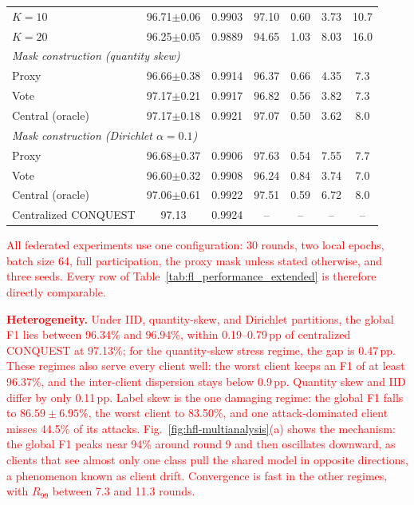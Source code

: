 \documentclass[conference]{IEEEtran}
\begin{document}
\begin{table}[!t]
\begin{tabular}{lcccccc}
$K{=}10$ & 96.71$\pm$0.06 & 0.9903 & 97.10 & 0.60 & 3.73 & 10.7 \\
$K{=}20$ & 96.25$\pm$0.05 & 0.9889 & 94.65 & 1.03 & 8.03 & 16.0 \\
\midrule
\multicolumn{7}{l}{\textit{Mask construction (quantity skew)}} \\
Proxy & 96.66$\pm$0.38 & 0.9914 & 96.37 & 0.66 & 4.35 & 7.3 \\
Vote & 97.17$\pm$0.21 & 0.9917 & 96.82 & 0.56 & 3.82 & 7.3 \\
Central (oracle) & 97.17$\pm$0.18 & 0.9921 & 97.07 & 0.50 & 3.62 & 8.0 \\
\midrule
\multicolumn{7}{l}{\textit{Mask construction (Dirichlet $\alpha{=}0.1$)}} \\
Proxy & 96.68$\pm$0.37 & 0.9906 & 97.63 & 0.54 & 7.55 & 7.7 \\
Vote & 96.60$\pm$0.32 & 0.9908 & 96.24 & 0.84 & 3.74 & 7.0 \\
Central (oracle) & 97.06$\pm$0.61 & 0.9922 & 97.51 & 0.59 & 6.72 & 8.0 \\
\midrule
Centralized CONQUEST & 97.13 & 0.9924 & -- & -- & -- & -- \\
\hline\toprule
\end{tabular}
\end{table}

\textcolor{red}{All federated experiments
use one configuration: 30 rounds, two local epochs, batch size 64,
full participation, the proxy mask unless stated otherwise, and three
seeds. Every row of Table~\ref{tab:fl_performance_extended} is
therefore directly comparable.}

\textcolor{red}{\textbf{Heterogeneity.} Under IID,
quantity-skew, and Dirichlet partitions, the global F1 lies between
96.34\% and 96.94\%, within 0.19--0.79\,pp of centralized CONQUEST at
97.13\%; for the quantity-skew stress regime, the gap is 0.47\,pp.
These regimes also serve every client well: the worst client keeps an
F1 of at least 96.37\%, and the inter-client dispersion stays below
0.9\,pp. Quantity skew and IID differ by only 0.11\,pp. Label skew is the one
damaging regime: the global F1 falls to $86.59\pm6.95\%$, the worst
client to 83.50\%, and one attack-dominated client misses 44.5\% of
its attacks. Fig.~\ref{fig:hfl-multianalysis}(a) shows the mechanism:
the global F1 peaks near 94\% around round 9 and then oscillates
downward, as clients that see almost only one class pull the shared
model in opposite directions, a phenomenon known as client drift.
Convergence is fast in the other regimes, with $R_{99}$ between 7.3
and 11.3 rounds.}
\end{document}

